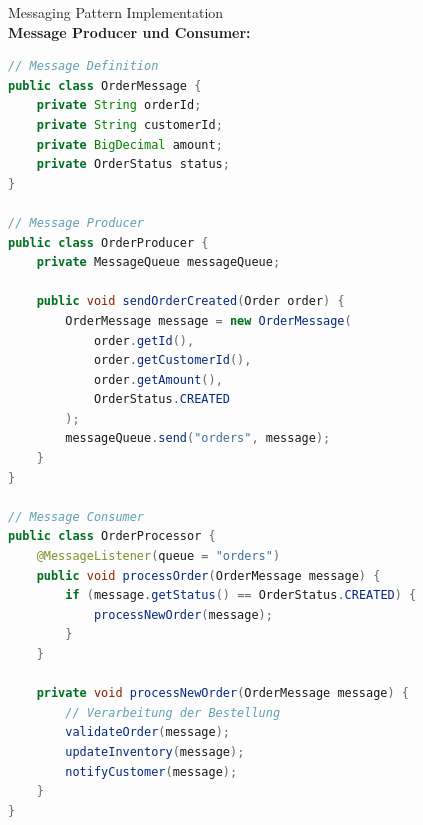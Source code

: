 \begin{example2}{Messaging Pattern Implementation}\\
\textbf{Message Producer und Consumer:}

\begin{lstlisting}[language=Java, style=basesmol]
// Message Definition
public class OrderMessage {
    private String orderId;
    private String customerId;
    private BigDecimal amount;
    private OrderStatus status;
}

// Message Producer
public class OrderProducer {
    private MessageQueue messageQueue;
    
    public void sendOrderCreated(Order order) {
        OrderMessage message = new OrderMessage(
            order.getId(),
            order.getCustomerId(),
            order.getAmount(),
            OrderStatus.CREATED
        );
        messageQueue.send("orders", message);
    }
}

// Message Consumer
public class OrderProcessor {
    @MessageListener(queue = "orders")
    public void processOrder(OrderMessage message) {
        if (message.getStatus() == OrderStatus.CREATED) {
            processNewOrder(message);
        }
    }
    
    private void processNewOrder(OrderMessage message) {
        // Verarbeitung der Bestellung
        validateOrder(message);
        updateInventory(message);
        notifyCustomer(message);
    }
}
\end{lstlisting}
\end{example2}

